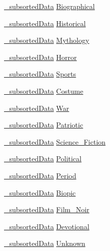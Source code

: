 \begin{DoxyCompactItemize}
\item 
\hyperlink{struct__subsorted_data}{\+\_\+subsorted\+Data} \hyperlink{struct__sorteddata_ade33d30d5aee90e955e06c737a37f5b1}{Biographical}
\item 
\hyperlink{struct__subsorted_data}{\+\_\+subsorted\+Data} \hyperlink{struct__sorteddata_a40c33b3577f4eeb4d78fc230a310e688}{Historical}
\item 
\hyperlink{struct__subsorted_data}{\+\_\+subsorted\+Data} \hyperlink{struct__sorteddata_a986181b5c12cb9a790275c1bd46b0029}{Mythology}
\item 
\hyperlink{struct__subsorted_data}{\+\_\+subsorted\+Data} \hyperlink{struct__sorteddata_ad32928b55309a9ab9417894f7deee67b}{Horror}
\item 
\hyperlink{struct__subsorted_data}{\+\_\+subsorted\+Data} \hyperlink{struct__sorteddata_af1bb8d9c0894b2f270b968840c77b49c}{Sports}
\item 
\hyperlink{struct__subsorted_data}{\+\_\+subsorted\+Data} \hyperlink{struct__sorteddata_a685680bf95366eff9cb28427838cb0c5}{Costume}
\item 
\hyperlink{struct__subsorted_data}{\+\_\+subsorted\+Data} \hyperlink{struct__sorteddata_a7fa587f3d0e3ffba53c3e4d122396448}{War}
\item 
\hyperlink{struct__subsorted_data}{\+\_\+subsorted\+Data} \hyperlink{struct__sorteddata_a0b5dca2895ffb81e209ecbf5dc3a7f42}{Patriotic}
\item 
\hyperlink{struct__subsorted_data}{\+\_\+subsorted\+Data} \hyperlink{struct__sorteddata_a5e2b96097d71580a442dfebfa5a92915}{Science\+\_\+\+Fiction}
\item 
\hyperlink{struct__subsorted_data}{\+\_\+subsorted\+Data} \hyperlink{struct__sorteddata_ad084e4af308585d2bfdc507d5bbd4847}{Political}
\item 
\hyperlink{struct__subsorted_data}{\+\_\+subsorted\+Data} \hyperlink{struct__sorteddata_ad812b95bbbf3e42bb5e140563c369a1f}{Period}
\item 
\hyperlink{struct__subsorted_data}{\+\_\+subsorted\+Data} \hyperlink{struct__sorteddata_a7cae290dce2d5c73dde61998e8121f35}{Biopic}
\item 
\hyperlink{struct__subsorted_data}{\+\_\+subsorted\+Data} \hyperlink{struct__sorteddata_abdce39e21b4d3f5abd59b3f627055d78}{Film\+\_\+\+Noir}
\item 
\hyperlink{struct__subsorted_data}{\+\_\+subsorted\+Data} \hyperlink{struct__sorteddata_a246158eb234e89ee2a0db48a44251283}{Devotional}
\item 
\hyperlink{struct__subsorted_data}{\+\_\+subsorted\+Data} \hyperlink{struct__sorteddata_a484257a5713abf7206eea555272393f0}{Unknown}
\end{DoxyCompactItemize}


